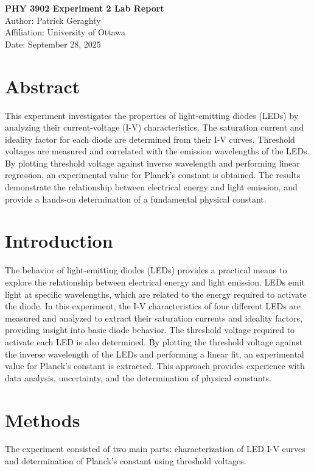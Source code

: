 \documentclass[12pt,a4paper]{article}
\begin{document}
\begin{center}
    {\LARGE\bfseries PHY 3902 Experiment 2 Lab Report}\\[1.5em]
    {\large Author: Patrick Geraghty}\\
    {\large Affiliation: University of Ottawa}\\
    {\large Date: September 28, 2025}
\end{center}

\section*{Abstract}
This experiment investigates the properties of light-emitting diodes (LEDs) by analyzing their current-voltage (I-V) characteristics. The saturation current and ideality factor for each diode are determined from their I-V curves. Threshold voltages are measured and correlated with the emission wavelengths of the LEDs. By plotting threshold voltage against inverse wavelength and performing linear regression, an experimental value for Planck's constant is obtained. The results demonstrate the relationship between electrical energy and light emission, and provide a hands-on determination of a fundamental physical constant.

\section{Introduction}
The behavior of light-emitting diodes (LEDs) provides a practical means to explore the relationship between electrical energy and light emission. LEDs emit light at specific wavelengths, which are related to the energy required to activate the diode. In this experiment, the I-V characteristics of four different LEDs are measured and analyzed to extract their saturation currents and ideality factors, providing insight into basic diode behavior. The threshold voltage required to activate each LED is also determined. By plotting the threshold voltage against the inverse wavelength of the LEDs and performing a linear fit, an experimental value for Planck's constant is extracted. This approach provides experience with data analysis, uncertainty, and the determination of physical constants.

\section{Methods}
The experiment consisted of two main parts: characterization of LED I-V curves and determination of Planck’s constant using threshold voltages.
\end{document}
